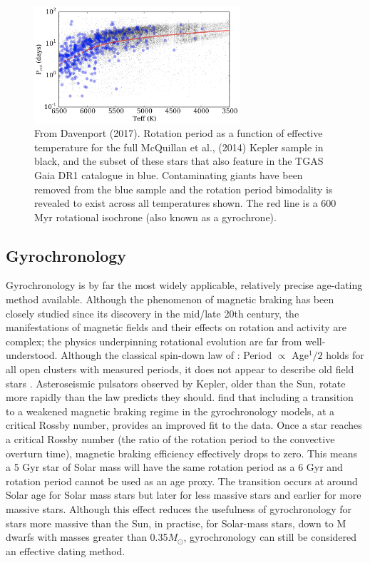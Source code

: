 \documentclass[useAMS, usenatbib, preprint, 12pt]{aastex}
\begin{document}
\begin{figure}
\begin{center}
\includegraphics[width=3in, clip=true]{Davenport.png}
\caption{From Davenport (2017).
    Rotation period as a function of effective
temperature for the full McQuillan et al., (2014) Kepler sample in black, and
the subset of these stars that also feature in the TGAS Gaia DR1 catalogue in
blue. Contaminating giants have been removed from the blue sample and the
rotation period bimodality is revealed to exist across all temperatures shown.
    The red line is a 600 Myr rotational isochrone (also known as a gyrochrone).}
\label{fig:davenport}
\end{center}
\end{figure}

\subsection{Gyrochronology}

Gyrochronology is by far the most widely applicable, relatively precise
age-dating method available.
Although the phenomenon of magnetic braking has been closely studied since its
discovery in the mid/late 20th century, the manifestations of magnetic fields
and their effects on rotation and activity are complex; the physics
underpinning rotational evolution are far from well-understood.
Although the classical spin-down law of \citet{skumanich1972}: Period
$\propto$ Age$^1/2$ holds for all open clusters with measured periods, it does
not appear to describe old field stars \citep{angus2015, van-saders2016}.
Asteroseismic pulsators observed by Kepler, older than the Sun, rotate more
rapidly than the \citet{skumanich1972} law predicts they should.
\citet{van-saders2016} find that including a transition to a weakened magnetic
braking regime in the gyrochronology models, at a critical Rossby number,
provides an improved fit to the data.
Once a star reaches a critical Rossby number (the ratio of the rotation period
to the convective overturn time), magnetic braking efficiency effectively
drops to zero.
This means a 5 Gyr star of Solar mass will have the same rotation period as a
6 Gyr and rotation period cannot be used as an age proxy.
The transition occurs at around Solar age for Solar mass stars but later for
less massive stars and earlier for more massive stars.
Although this effect reduces the usefulness of gyrochronology for stars more
massive than the Sun, in practise, for Solar-mass stars, down to M dwarfs with
masses greater than 0.35$M_\odot$, gyrochronology can still be considered an
effective dating method.
\end{document}
